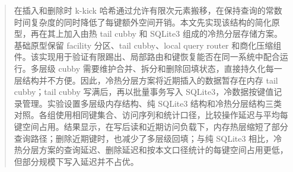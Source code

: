 \documentclass[
    type = bachelor,
    decl-page,  %
    twoside,                %
  ]{njuthesis}
\begin{document}

\maketitle

\raggedbottom

\begin{abstract}

在插入和删除时 k-kick 哈希通过允许有限次元素搬移，在保持查询的常数时间复杂度的同时降低了每键额外空间开销。本文先实现该结构的简化原型，再在其上加入由热 tail cubby 和 SQLite3 组成的冷热分层存储方案。基础原型保留 facility 分区、tail cubby、local query router 和商化压缩组件。该实现用于验证有限踢出、局部路由和键恢复能否在同一系统中配合运行。多层级 cubby 需要维护合并、拆分和删除回填状态，直接持久化每一层结构并不方便。因此，冷热分层方案将近期插入的数据暂存在内存 tail cubby；tail cubby 写满后，再以批量事务写入 SQLite3，冷数据按键值记录管理。实验设置多层级内存结构、纯 SQLite3 结构和冷热分层结构三类对照。各组使用相同键集合、访问序列和统计口径，比较操作延迟与平均每键空间占用。结果显示，在写后读和近期访问负载下，内存热层缩短了部分查询路径；删除近期键时，也减少了多层级回填；与纯 SQLite3 相比，冷热分层方案的查询延迟、删除延迟和按本文口径统计的每键空间占用更低，但部分规模下写入延迟并不占优。

\end{abstract}
\end{document}
